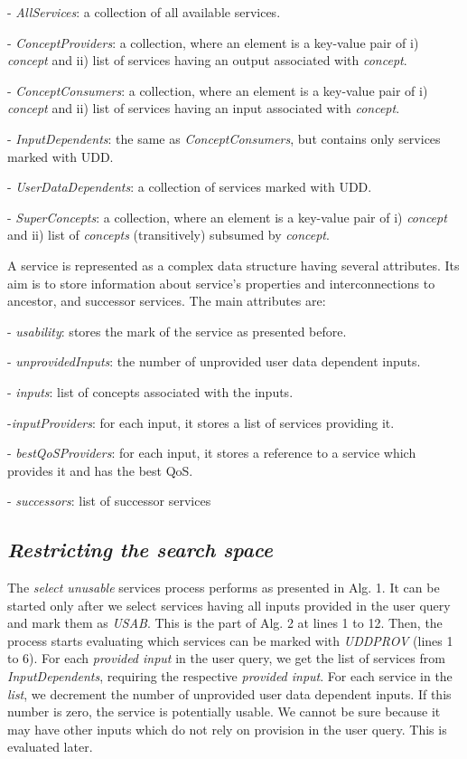 \documentclass[10pt]{llncs}
\begin{document}
 - \textit{AllServices}: a collection of all available services.

 - \textit{ConceptProviders}: a collection, where an element is a key-value pair of i) \textit{concept} and ii) list of services having an output associated with \textit{concept}. 

- \textit{ConceptConsumers}: a collection, where an element is a key-value pair of i) \textit{concept} and ii) list of services having an input associated with \textit{concept}. 

- \textit{InputDependents}: the same as \textit{ConceptConsumers}, but contains only services marked with UDD.

- \textit{UserDataDependents}: a collection of services marked with UDD. 

- \textit{SuperConcepts}: a collection, where an element is a key-value pair of i) \textit{concept }and ii) list of \textit{concepts }(transitively) subsumed by \textit{concept}.

 A service is represented as a complex data structure having several attributes. Its aim is to store information about service’s properties and interconnections to ancestor, and successor services. The main attributes are: 

- \textit{usability}: stores the mark of the service as presented before. 

- \textit{unprovidedInputs}: the number of unprovided user data dependent inputs. 

- \textit{inputs}: list of concepts associated with the inputs. 

-\textit{inputProviders}: for each input, it stores a list of services providing it. 

- \textit{bestQoSProviders}: for each input, it stores a reference to a service which provides it and has the best QoS. 

- \textit{successors}: list of successor services
\subsection{\textit{Restricting the search space}
}

The \textit{select unusable} services process performs as presented in Alg. 1. It can be started only after we select services having all inputs provided in the user query and mark them as \textit{USAB}. This is the part of Alg. 2 at lines 1 to 12. Then, the process starts evaluating which services can be marked with \textit{UDDPROV} (lines 1 to 6). For each \textit{provided input} in the user query, we get the list of services from \textit{InputDependents}, requiring the respective \textit{provided input}. For each service in the \textit{list}, we decrement the number of unprovided user data dependent inputs. If this number is zero, the service is potentially usable. We cannot be sure because it may have other inputs which do not rely on provision in the user query. This is evaluated later.
\end{document}
